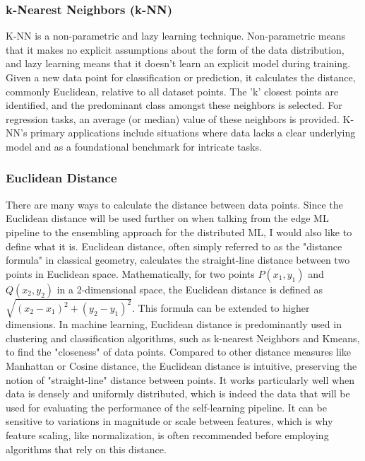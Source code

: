 \subsubsection{k-Nearest Neighbors (k-NN)}
K-NN is a non-parametric and lazy learning technique. Non-parametric means that it makes no explicit assumptions about the form of the data distribution, and lazy learning means that it doesn't learn an explicit model during training.
 Given a new data point for classification or prediction, it calculates the distance, commonly Euclidean, relative to all dataset points. The 'k' closest points are identified, and the predominant class amongst these neighbors is selected. For regression tasks, an average (or median) value of these neighbors is provided. K-NN's primary applications include situations where data lacks a clear underlying model and as a foundational benchmark for intricate tasks\cite{ML_paper}.

\subsubsection{Euclidean Distance}
There are many ways to calculate the distance between data points. Since the Euclidean distance will be used further on when talking from the edge ML pipeline to the ensembling approach for the distributed ML, I would also like to define what it is. Euclidean distance, often simply referred to as the "distance formula" in classical geometry, calculates the straight-line distance between two points in Euclidean space. Mathematically, for two points $P(x_1, y_1)$ and $Q(x_2, y_2)$ in a 2-dimensional space, the Euclidean distance is defined as $\sqrt{(x_2 - x_1)^2 + (y_2 - y_1)^2}$. This formula can be extended to higher dimensions. In machine learning, Euclidean distance is predominantly used in clustering and classification algorithms, such as k-nearest Neighbors and Kmeans, to find the "closeness" of data points. Compared to other distance measures like Manhattan or Cosine distance, the Euclidean distance is intuitive, preserving the notion of "straight-line" distance between points. It works particularly well when data is densely and uniformly distributed, which is indeed the data that will be used for evaluating the performance of the self-learning pipeline. It can be sensitive to variations in magnitude or scale between features, which is why feature scaling, like normalization, is often recommended before employing algorithms that rely on this distance.


